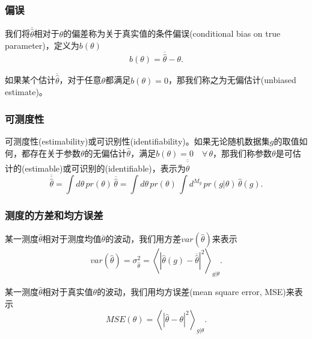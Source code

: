 \subsubsection{偏误}
\label{sec:mle-bias-def}
我们将$\overline{\hat{\theta}}$相对于$\theta$的偏差称为关于真实值的条件偏误(conditional bias on true parameter)，定义为$b(\theta)$
\begin{equation}
  \label{eq:mle-conditional-bias}
  b(\theta) = \overline{\hat{\theta}} - \theta.
\end{equation}

如果某个估计$\overline{\hat{\theta}}$，对于任意$\theta$都满足$b(\theta) = 0$，那我们称之为无偏估计(unbiased estimate)。

\subsubsection{可测度性}
\label{sec:mle-estimability}
可测度性(estimability)或可识别性(identifiability)。如果无论随机数据集$g$的取值如何，都存在关于参数$\theta$的无偏估计$\hat{\theta}$，满足$b(\theta) = 0 \quad \forall \, \theta$，那我们称参数$\theta$是可估计的(estimable)或可识别的(identifiable)，表示为$\overline{\overline{\hat{\theta}}}$
\begin{equation}
  \label{eq:mle-estimablility}
  \overline{\overline{\hat{\theta}}}
  = \int d \theta \, pr(\theta) \, \overline{\hat{\theta}}
  = \int d \theta \, pr(\theta) \, \int d^{M_g} \, pr(g | \theta) \, \hat{\theta}(g).
\end{equation}

\subsubsection{测度的方差和均方误差}
\label{sec:mle-estimate-var-mse}
某一测度$\hat{\theta}$相对于测度均值$\overline{\theta}$的波动，我们用方差$var \left( \hat{\theta} \right)$来表示
\begin{equation}
  \label{eq:mle-variance-hat}
  var \left( \hat{\theta} \right)
  = \sigma_{\hat{\theta}}^{2}
  = \left\langle
  \left|
  \hat{\theta}(g) - \overline{\hat{\theta}}
  \right|^{2}
  \right\rangle_{g | \theta}.
\end{equation}

某一测度$\hat{\theta}$相对于真实值$\theta$的波动，我们用均方误差(mean square error, MSE)来表示
\begin{equation}
  \label{eq:mle-mse-def}
  MSE(\theta) = \left\langle
  \left| \hat{\theta} - \theta \right|^{2}
  \right\rangle_{g | \theta}.
\end{equation}

